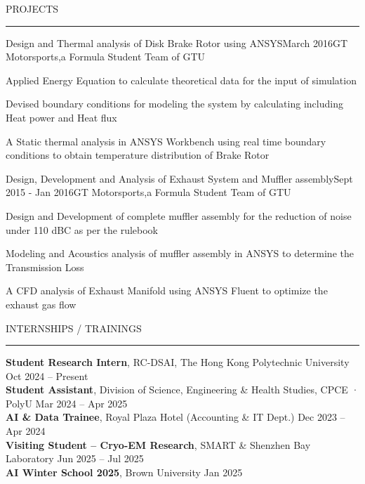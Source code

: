 \documentclass{resume} %
\renewenvironment{rSection}[1]{
\sectionskip
\textcolor{TsinghuaPurple}{\MakeUppercase{#1}}
\sectionlineskip
\hrule
\begin{list}{}{
\setlength{\leftmargin}{0em}
}
\item[]
}{
\end{list}
}
\begin{document}
\begin{rSection}{PROJECTS}
\begin{rSubsection}{Design and Thermal analysis of Disk Brake Rotor using ANSYS}{March 2016}{GT Motorsports,a Formula Student Team of GTU}{}
\item Applied Energy Equation to calculate theoretical data for the input of simulation
\item Devised boundary conditions for modeling the system by calculating including Heat power and Heat flux    
\item A Static thermal analysis in ANSYS Workbench using real time boundary conditions to obtain temperature distribution of Brake Rotor  

\end{rSubsection}


\begin{rSubsection}{Design, Development and Analysis of Exhaust System and  Muffler assembly}{Sept 2015 - Jan 2016}{GT Motorsports,a Formula Student Team of GTU}{}    

\item Design and Development of complete muffler assembly for the reduction of noise under 110 dBC as per the rulebook        
\item Modeling and Acoustics analysis of muffler assembly in ANSYS to determine the  Transmission Loss
\item A CFD analysis of Exhaust Manifold using ANSYS Fluent to optimize the exhaust gas flow

\end{rSubsection} 

\end{rSection} 


\begin{rSection}{INTERNSHIPS / TRAININGS} \itemsep -3pt

{\textbf{Student Research Intern}, RC-DSAI, The Hong Kong Polytechnic University} \hfill Oct 2024 -- Present \\ 
{\textbf{Student Assistant}, Division of Science, Engineering \& Health Studies, CPCE · PolyU} \hfill Mar 2024 -- Apr 2025 \\ 
{\textbf{AI \& Data Trainee}, Royal Plaza Hotel (Accounting \& IT Dept.)} \hfill Dec 2023 -- Apr 2024 \\ 
{\textbf{Visiting Student – Cryo-EM Research}, SMART \& Shenzhen Bay Laboratory} \hfill Jun 2025 -- Jul 2025 \\ 
{\textbf{AI Winter School 2025}, Brown University} \hfill Jan 2025 

\end{rSection}
\end{document}
